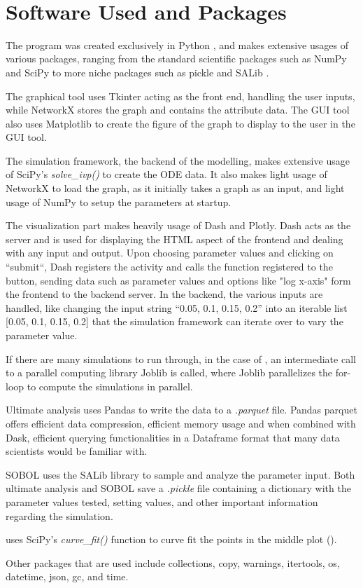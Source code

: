 \


\section{Software Used and Packages}
The program was created exclusively in Python \cite{Python}, and makes extensive usages of various packages, ranging from the standard scientific packages such as NumPy \cite{NumPy} and SciPy to more niche packages such as pickle and SALib \cite{iwanagaSALib20Advancing2022, hermanSALibOpensourcePython2017}.

The graphical tool uses Tkinter acting as the front end, handling the user inputs, while NetworkX \cite{hagbergExploringNetworkStructure2008} stores the graph and contains the attribute data. 
The GUI tool also uses Matplotlib \cite{Matplotlib}to create the figure of the graph to display to the user in the GUI tool.

The simulation framework, the backend of the modelling, makes extensive usage of SciPy's \textit{solve\_ivp()} to create the ODE data. 
It also makes light usage of NetworkX to load the graph, as it initially takes a graph as an input, and light usage of NumPy to setup the parameters at startup. 

The visualization part makes heavily usage of Dash and Plotly. 
Dash acts as the server and is used for displaying the HTML aspect of the frontend and dealing with any input and output. 
Upon choosing parameter values and clicking on “submit“, Dash registers the activity and calls the function registered to the button, sending data such as parameter values and options like "log x-axis" form the frontend to the backend server. 
In the backend, the various inputs are handled, like changing the input string “0.05, 0.1, 0.15, 0.2” into an iterable list [0.05, 0.1, 0.15, 0.2] that the simulation framework can iterate over to vary the parameter value. 

If there are many simulations to run through, in the case of , an intermediate call to a parallel computing library Joblib is called, where Joblib parallelizes the for-loop to compute the simulations in parallel. 

Ultimate analysis uses Pandas to write the data to a \textit{.parquet} file. 
Pandas parquet offers efficient data compression, efficient memory usage and when combined with Dask, efficient querying functionalities in a Dataframe format that many data scientists would be familiar with. 

SOBOL uses the SALib library to sample and analyze the parameter input. 
Both ultimate analysis and SOBOL save a \textit{.pickle} file containing a dictionary with the parameter values tested, setting values, and other important information regarding the simulation. 

 uses SciPy's \textit{curve\_fit()} function to curve fit the points in the middle plot (). 

Other packages that are used include collections, copy, warnings, itertools, os, datetime, json, gc, and time. 

